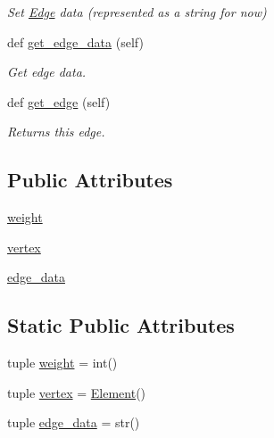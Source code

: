 \begin{DoxyCompactItemize}
\begin{DoxyCompactList}\small\item\em Set \hyperlink{classbridges_1_1edge_1_1_edge}{Edge} data (represented as a string for now) \end{DoxyCompactList}\item 
def \hyperlink{classbridges_1_1edge_1_1_edge_ae26e8172b91667d829b86145ce88208e}{get\+\_\+edge\+\_\+data} (self)
\begin{DoxyCompactList}\small\item\em Get edge data. \end{DoxyCompactList}\item 
def \hyperlink{classbridges_1_1edge_1_1_edge_a406b906ea8e177a6e54f6c794c04df3d}{get\+\_\+edge} (self)
\begin{DoxyCompactList}\small\item\em Returns this edge. \end{DoxyCompactList}\end{DoxyCompactItemize}
\subsection*{Public Attributes}
\begin{DoxyCompactItemize}
\item 
\hyperlink{classbridges_1_1edge_1_1_edge_a1137b3a75c3bffd6cfccb994fd9a5c13}{weight}
\item 
\hyperlink{classbridges_1_1edge_1_1_edge_af894a206ef35d03cdb75faea83a0fc5a}{vertex}
\item 
\hyperlink{classbridges_1_1edge_1_1_edge_af9697b2b1e1e87d880a10c0c4e7de70d}{edge\+\_\+data}
\end{DoxyCompactItemize}
\subsection*{Static Public Attributes}
\begin{DoxyCompactItemize}
\item 
tuple \hyperlink{classbridges_1_1edge_1_1_edge_a4e5e58a10166fb6043c0b8db8dbda5a2}{weight} = int()
\item 
tuple \hyperlink{classbridges_1_1edge_1_1_edge_a74edcc1b64f904141578fae68593be03}{vertex} = \hyperlink{classbridges_1_1element_1_1_element}{Element}()
\item 
tuple \hyperlink{classbridges_1_1edge_1_1_edge_a1bdbba563466042b45089320f6232a40}{edge\+\_\+data} = str()
\end{DoxyCompactItemize}


